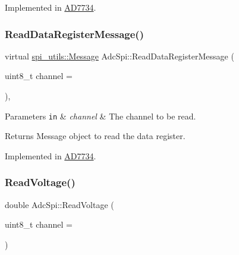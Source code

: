 Implemented in \mbox{\hyperlink{classAD7734_aa13b49141e69a45508998004a208afdc}{A\+D7734}}.

\mbox{\label{classAdcSpi_a3578f18e1976d9e2b075a3fbdc003517}} 
\subsubsection{\texorpdfstring{Read\+Data\+Register\+Message()}{ReadDataRegisterMessage()}}
{\footnotesize\ttfamily virtual \mbox{\hyperlink{structspi__utils_1_1Message}{spi\+\_\+utils\+::\+Message}} Adc\+Spi\+::\+Read\+Data\+Register\+Message (\begin{DoxyParamCaption}\item[{uint8\+\_\+t}]{channel = {} }\end{DoxyParamCaption})\hspace{0.3cm}{\ttfamily [protected]}, {}}


\begin{DoxyParams}[1]{Parameters}
\mbox{\tt in}  & {\em channel} & The channel to be read. \\
\hline
\end{DoxyParams}
\begin{DoxyReturn}{Returns}
Message object to read the data register. 
\end{DoxyReturn}


Implemented in \mbox{\hyperlink{classAD7734_a6fa5e7c2bd8cde50dccb328d36f12516}{A\+D7734}}.

\mbox{\label{classAdcSpi_ace8264acfedb357986afa5f611eff3ee}} 
\subsubsection{\texorpdfstring{Read\+Voltage()}{ReadVoltage()}\hspace{0.1cm}{\footnotesize\ttfamily [1/2]}}
{\footnotesize\ttfamily double Adc\+Spi\+::\+Read\+Voltage (\begin{DoxyParamCaption}\item[{uint8\+\_\+t}]{channel = {} }\end{DoxyParamCaption})}

